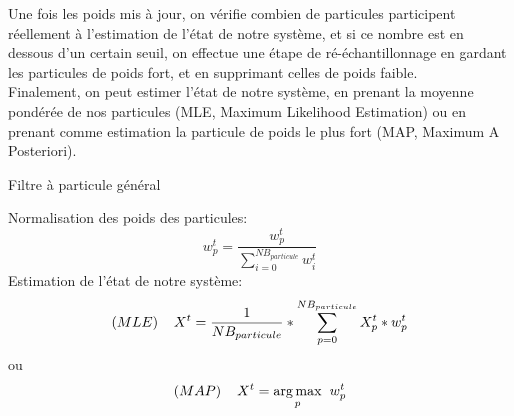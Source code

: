Une fois les poids mis à jour, on vérifie combien de particules participent réellement à l'estimation de l'état de notre système, et si ce nombre est en dessous d'un certain seuil, on effectue une étape de ré-échantillonnage en gardant les particules de poids fort, et en supprimant celles de poids faible.\\
Finalement, on peut estimer l'état de notre système, en prenant la moyenne pondérée de nos particules (MLE, Maximum Likelihood Estimation) ou en prenant comme estimation la particule de poids le plus fort (MAP, Maximum A Posteriori).

\begin{algorithm}
	\caption{Filtre à particule général}\label{alg:particlefilter_basic}
	Normalisation des poids des particules: $$w_{p}^{t} = \frac{w_{p}^{t}}{\sum_{i=0}^{NB_{particule}} w_{i}^{t}}$$
	Estimation de l'état de notre système:
	$$(MLE) \hspace{0.4cm} X^{t} = \frac{1}{NB_{particule}} * \sum_{p=0}^{NB_{particule}} X_{p}^{t}*w_{p}^{t}$$
	ou
	$$(MAP) \hspace{0.4cm} X^{t} = \underset{p}{\arg\max} \hspace{0.2cm} w_{p}^{t}$$
\end{algorithm}
\FloatBarrier

